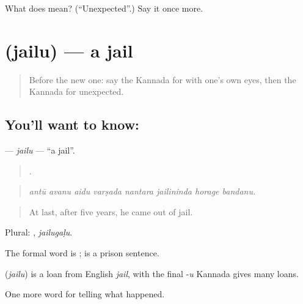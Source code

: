 \begin{tcolorbox}[breakable,colback=teal!4,colframe=teal!35!black,title={Before you move on}]
What does  mean? (\textquotedblleft{}Unexpected\textquotedblright{}.) Say it once more.
\end{tcolorbox}
\section[\texorpdfstring{\kn{ಜೈಲು} (jailu)}{ಜೈಲು (jailu)}]{ (jailu) — a jail}

\label{lesson:KA-C369-jailu}



\begin{quote}
Before the new one: say the Kannada for with one's own eyes, then the Kannada for unexpected.
\end{quote}

\subsection*{You'll want to know: }
\textbf{} — \emph{jailu} — \textquotedblleft{}a jail\textquotedblright{}.

\begin{quote}
       .
\end{quote}

\begin{quote}
\emph{antū avanu aidu varṣada nantara jailininda horage bandanu.}
\end{quote}

\begin{quote}
At last, after five years, he came out of jail.
\end{quote}

Plural: , \emph{jailugaḷu}.

The formal word is ;   is a prison sentence.

\begin{cousinweb}
\textbf{} (\emph{jailu}) is a loan from English \emph{jail}, with the final -\emph{u} Kannada gives many loans.
\end{cousinweb}

\begin{grammarlens}[title={What you've built}]
One more word for telling what happened.
\end{grammarlens}

